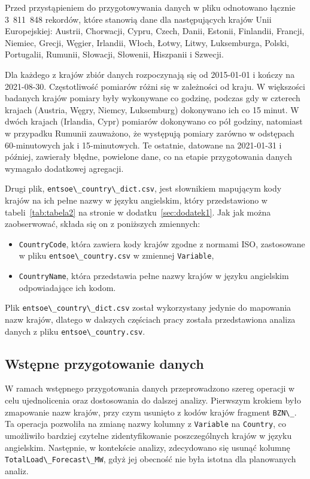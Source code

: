 \documentclass[polish, twoside, 12pt, a4paper]{article}
\theoremstyle{definition}
\theoremstyle{plain}
\theoremstyle{remark}
\newcommand{\code}[1]{\lstinline{#1}}
\begin{document}
Przed przystąpieniem do przygotowywania danych w pliku odnotowano łącznie 3~811~848 rekordów, które stanowią dane dla następujących krajów Unii Europejskiej: Austrii, Chorwacji, Cypru, Czech, Danii, Estonii, Finlandii, Francji, Niemiec, Grecji, Węgier, Irlandii, Włoch, Łotwy, Litwy, Luksemburga, Polski, Portugalii, Rumunii, Słowacji, Słowenii, Hiszpanii i Szwecji. 

Dla każdego z krajów zbiór danych rozpoczynają się od 2015-01-01 i kończy na 2021-08-30. Częstotliwość pomiarów różni się w zależności od kraju. W większości badanych krajów pomiary były wykonywane co godzinę, podczas gdy w czterech krajach (Austria, Węgry, Niemcy, Luksemburg) dokonywano ich co 15 minut. W dwóch krajach (Irlandia, Cypr) pomiarów dokonywano co pół godziny, natomiast w przypadku Rumunii zauważono, że występują pomiary zarówno w odstępach 60-minutowych jak i 15-minutowych. Te ostatnie, datowane na 2021-01-31 i później, zawierały błędne, powielone dane, co na etapie przygotowania danych wymagało dodatkowej agregacji. 

Drugi plik, \code{entsoe\_country\_dict.csv}, jest słownikiem mapującym kody krajów na ich pełne nazwy w języku angielskim, który przedstawiono  w tabeli~\ref{tab:tabela2} na stronie \pageref{tab:tabela2} w dodatku~\ref{sec:dodatek1}. Jak jak można zaobserwować, składa się on z poniższych zmiennych:
\begin{itemize}[noitemsep]
    \item \code{CountryCode}, która zawiera kody krajów zgodne z normami ISO, zastosowane w pliku \code{entsoe\_country.csv} w zmiennej \code{Variable},
    \item \code{CountryName}, która przedstawia pełne nazwy krajów w języku angielskim odpowiadające ich kodom.
\end{itemize}

Plik \code{entsoe\_country\_dict.csv} został wykorzystany jedynie do mapowania nazw krajów, dlatego w dalszych częściach pracy została przedstawiona analiza danych z pliku \code{entsoe\_country.csv}.

\subsection{Wstępne przygotowanie danych}\label{przygotowanie-danych}

W ramach wstępnego przygotowania danych przeprowadzono szereg operacji w celu ujednolicenia oraz dostosowania do dalszej analizy. 
Pierwszym krokiem było zmapowanie nazw krajów, przy czym usunięto z kodów krajów fragment \code{BZN\_}. Ta operacja pozwoliła na zmianę nazwy kolumny z \code{Variable} na \code{Country}, co umożliwiło bardziej czytelne zidentyfikowanie poszczególnych krajów w języku angielskim. Następnie, w kontekście analizy, zdecydowano się usunąć kolumnę \code{TotalLoad\_Forecast\_MW}, gdyż jej obecność nie była istotna dla planowanych analiz.
\end{document}
